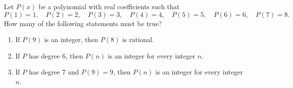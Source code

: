 Let $P(x)$ be a polynomial with real coefficients such that
\[P(1)=1,\quad P(2)=2,\quad P(3)=3,\quad P(4)=4,\quad P(5)=5,\quad P(6)=6,\quad P(7)=8.\]
How many of the following statements must be true?
\begin{enumerate}
\item[I.] If $P(9)$ is an integer, then $P(8)$ is rational.
\item[II.] If $P$ has degree $6$, then $P(n)$ is an integer for every integer $n$.
\item[III.] If $P$ has degree $7$ and $P(9)=9$, then $P(n)$ is an integer for every integer $n$.
\end{enumerate}
